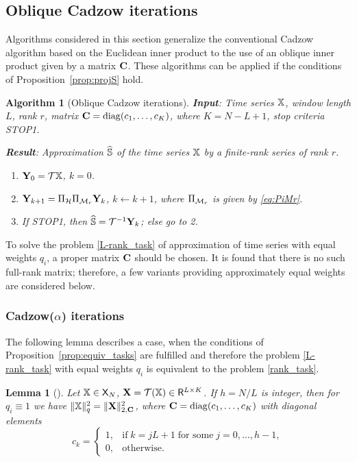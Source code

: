 \documentclass[sii]{ipart}
\newtheorem{algorithm}{Algorithm}
\newtheorem{lemma}{Lemma}
\begin{document}
\subsection{Oblique Cadzow iterations}
\label{sec:ObliqueCadzow}
Algorithms considered in this section generalize the conventional Cadzow algorithm based on the Euclidean inner product to the use of an oblique inner product given by a matrix $\mathbf{C}$.
These algorithms can be applied if the conditions of Proposition~\ref{prop:projS} hold.

\begin{algorithm}[Oblique Cadzow iterations]
	\label{alg:obliqueCadzow}
	\textbf{Input}: Time series $\mathbb{X}$, window length $L$, rank $r$, matrix $\mathbf{C}=\mathop{\mathrm{diag}}(c_1,\ldots, c_K)$, where $K=N-L+1$,
	stop criteria STOP1.
	
	\textbf{Result}:
	Approximation $\widehat{\mathbb{S}}$ of the time series $\mathbb{X}$ by a finite-rank series of rank $r$.
	
	\begin{enumerate}
		\item
		$\mathbf{Y}_0 = \mathcal{T} \mathbb{X}$, $k=0$.
		\item
		$\mathbf{Y}_{k+1} = \Pi_{\mathcal{H}}  \Pi_{\mathcal{M}_r} \mathbf{Y}_{k}$, $k\leftarrow k+1$, where
		$\Pi_{\mathcal{M}_r}$ is given by \eqref{eq:PiMr}.
		\item
		If STOP1, then $\widehat{\mathbb{S}} = \mathcal{T}^{-1} \mathbf{Y}_k$; else go to 2.
	\end{enumerate}
\end{algorithm}

To solve the problem \eqref{L-rank_task} of approximation of time series with equal weights $q_i$, a proper matrix $\mathbf{C}$ should be chosen. It is found that there is no such full-rank matrix; therefore, a few variants providing approximately equal weights are considered below.

\subsubsection{Cadzow($\alpha$) iterations}
\label{sec:cadzow_alpha}
The following lemma describes a case, when the conditions of Proposition~\ref{prop:equiv_tasks} are fulfilled and therefore
the problem \eqref{L-rank_task} with equal weights $q_i$ is equivalent to the problem \eqref{rank_task}.

\begin{lemma}[\cite{Gillard2014}]
	\label{zhiglemma}
	Let $\mathbb{X} \in \mathsf{X}_N$, $\mathbf{X} = \mathcal{T}(\mathbb{X}) \in \mathsf{R}^{L \times K}$. If $h = N/L$ is integer, then for $q_i\equiv 1$ we have $\|\mathbb{X}\|^2_q = \|\mathbf{X}\|^2_{2, \mathbf{C}}$, where $\mathbf{C}=\mathop{\mathrm{diag}}(c_1,\ldots,c_K)$ with diagonal elements
	\begin{equation*}
	c_k = \begin{cases}
	1, & \text{if} \; k = jL+1 \;\text{for some} \; j = 0, \ldots, h-1, \\
	0, & \text{otherwise}.
	\end{cases}
	\end{equation*}
\end{lemma}
\end{document}
